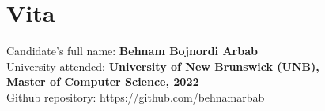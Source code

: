 \clearpage
{}  %
\chapter*{Vita}
\pagestyle{empty}
\thispagestyle{empty}
\singlespacing
Candidate's full name:
\textbf{Behnam Bojnordi Arbab}\\
University attended:
\textbf{University of New Brunswick (UNB),\\
Master of Computer Science, 2022}\\
Github repository: https://github.com/behnamarbab